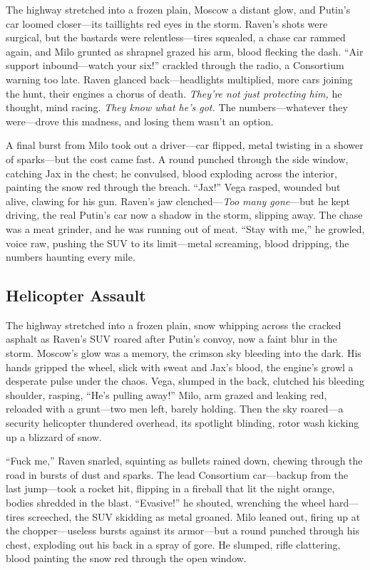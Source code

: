 \documentclass[12pt]{book}
\begin{document}
The highway stretched into a frozen plain, Moscow a distant glow, and Putin’s car loomed closer—its taillights red eyes in the storm. Raven’s shots were surgical, but the bastards were relentless—tires squealed, a chase car rammed again, and Milo grunted as shrapnel grazed his arm, blood flecking the dash. “Air support inbound—watch your six!” crackled through the radio, a Consortium warning too late. Raven glanced back—headlights multiplied, more cars joining the hunt, their engines a chorus of death. \textit{They’re not just protecting him,} he thought, mind racing. \textit{They know what he’s got.} The numbers—whatever they were—drove this madness, and losing them wasn’t an option.

A final burst from Milo took out a driver—car flipped, metal twisting in a shower of sparks—but the cost came fast. A round punched through the side window, catching Jax in the chest; he convulsed, blood exploding across the interior, painting the snow red through the breach. “Jax!” Vega rasped, wounded but alive, clawing for his gun. Raven’s jaw clenched—\textit{Too many gone}—but he kept driving, the real Putin’s car now a shadow in the storm, slipping away. The chase was a meat grinder, and he was running out of meat. “Stay with me,” he growled, voice raw, pushing the SUV to its limit—metal screaming, blood dripping, the numbers haunting every mile.


\subsection{Helicopter Assault}

The highway stretched into a frozen plain, snow whipping across the cracked asphalt as Raven’s SUV roared after Putin’s convoy, now a faint blur in the storm. Moscow’s glow was a memory, the crimson sky bleeding into the dark. His hands gripped the wheel, slick with sweat and Jax’s blood, the engine’s growl a desperate pulse under the chaos. Vega, slumped in the back, clutched his bleeding shoulder, rasping, “He’s pulling away!” Milo, arm grazed and leaking red, reloaded with a grunt—two men left, barely holding. Then the sky roared—a security helicopter thundered overhead, its spotlight blinding, rotor wash kicking up a blizzard of snow.

“Fuck me,” Raven snarled, squinting as bullets rained down, chewing through the road in bursts of dust and sparks. The lead Consortium car—backup from the last jump—took a rocket hit, flipping in a fireball that lit the night orange, bodies shredded in the blast. “Evasive!” he shouted, wrenching the wheel hard—tires screeched, the SUV skidding as metal groaned. Milo leaned out, firing up at the chopper—useless bursts against its armor—but a round punched through his chest, exploding out his back in a spray of gore. He slumped, rifle clattering, blood painting the snow red through the open window.
\end{document}
